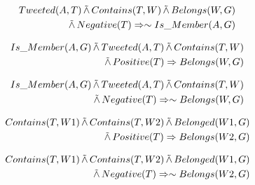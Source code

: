 \begin{align*}
\begin{split}
Tweeted(A,T)
	 \softand Contains(T,W)
	\softand Belongs(W,G)\\
	 \softand Negative(T)
	\Rightarrow \sim Is\_Member(A,G)
\end{split}
\end{align*}

\begin{align*}
\begin{split}
Is\_Member(A,G)
	 \softand Tweeted(A,T)
	\softand Contains(T,W)\\
	 \softand Positive(T) 
	\Rightarrow Belongs(W,G)
\end{split}
\end{align*}

\begin{align*}
\begin{split}
Is\_Member(A,G) 
	\softand Tweeted(A,T)
	\softand Contains(T,W)\\
	\softand Negative(T)
	\Rightarrow \sim Belongs(W,G)
\end{split}
\end{align*}

\begin{align*}
\begin{split}
Contains(T,W1)
 \softand Contains(T,W2)
  \softand Belonged(W1,G)\\ 
  \softand Positive(T)
	\Rightarrow Belongs(W2,G)
\end{split}
\end{align*}

\begin{align*}
\begin{split}
Contains(T,W1) 
	\softand Contains(T,W2)
	\softand Belonged(W1,G)\\ 
	\softand Negative(T)
	\Rightarrow \sim Belongs(W2,G)
\end{split}
\end{align*}

